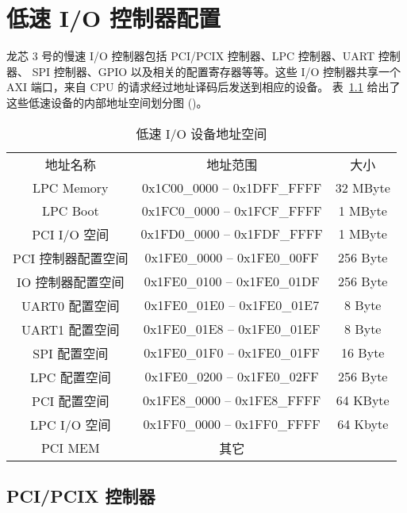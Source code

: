 \chapter{低速 I/O 控制器配置}

龙芯 3 号的慢速 I/O 控制器包括 PCI/PCIX 控制器、LPC 控制器、UART 控制器、 SPI
控制器、GPIO 以及相关的配置寄存器等等。这些 I/O 控制器共享一个 AXI 端口，来自
CPU 的请求经过地址译码后发送到相应的设备。 表~\ref{tab:lsioAddrSpace}
给出了这些低速设备的内部地址空间划分图
()。

\begin{table}[ht]
  \centering
  \begin{tabular}[h]{|c|c|c|} \hline
    地址名称           &   地址范围                   & 大小 \\ \hhline
    LPC Memory         & 0x1C00\_0000 – 0x1DFF\_FFFF & 32 MByte \\ \hline
    LPC Boot           & 0x1FC0\_0000 – 0x1FCF\_FFFF & 1 MByte \\ \hline
    PCI I/O 空间       & 0x1FD0\_0000 – 0x1FDF\_FFFF & 1 MByte \\ \hline
    PCI 控制器配置空间 & 0x1FE0\_0000 – 0x1FE0\_00FF & 256 Byte \\ \hline
    IO 控制器配置空间  & 0x1FE0\_0100 – 0x1FE0\_01DF & 256 Byte \\ \hline
    UART0 配置空间     & 0x1FE0\_01E0 – 0x1FE0\_01E7 & 8 Byte \\ \hline
    UART1 配置空间     & 0x1FE0\_01E8 – 0x1FE0\_01EF & 8 Byte \\ \hline
    SPI 配置空间       & 0x1FE0\_01F0 – 0x1FE0\_01FF & 16 Byte \\ \hline
    LPC 配置空间       & 0x1FE0\_0200 – 0x1FE0\_02FF & 256 Byte \\ \hline
    PCI 配置空间       & 0x1FE8\_0000 – 0x1FE8\_FFFF & 64 KByte \\ \hline
    LPC I/O 空间       & 0x1FF0\_0000 – 0x1FF0\_FFFF & 64 Kbyte \\ \hline
    PCI MEM            & 其它                         & \\ \hline
  \end{tabular}
  \caption{低速 I/O 设备地址空间}
  \label{tab:lsioAddrSpace}
\end{table}

\section{PCI/PCIX 控制器}

